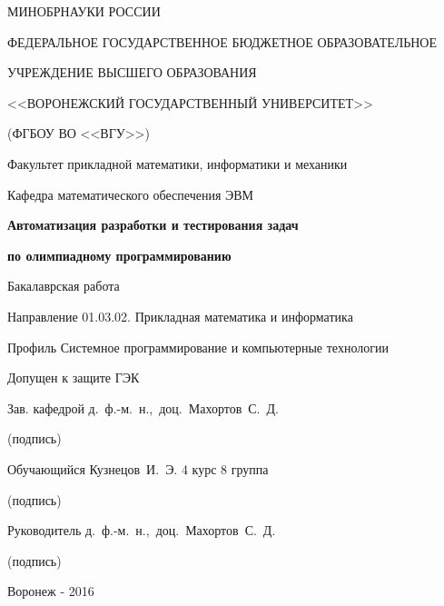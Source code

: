 \thispagestyle{empty}

\begin{center}
{\small
МИНОБРНАУКИ РОССИИ\par
ФЕДЕРАЛЬНОЕ ГОСУДАРСТВЕННОЕ БЮДЖЕТНОЕ ОБРАЗОВАТЕЛЬНОЕ\par
УЧРЕЖДЕНИЕ ВЫСШЕГО ОБРАЗОВАНИЯ\par
<<ВОРОНЕЖСКИЙ ГОСУДАРСТВЕННЫЙ УНИВЕРСИТЕТ>>\par
(ФГБОУ ВО <<ВГУ>>)\par
\vspace{4mm}}

Факультет прикладной математики, информатики и механики\par
\vspace{5mm}
Кафедра математического обеспечения ЭВМ\par
\vspace{35mm}

\textbf{Автоматизация разработки и тестирования задач}\par
\textbf{по олимпиадному программированию}\par
\vspace{8mm}

Бакалаврская работа\par
Направление 01.03.02. Прикладная математика и информатика\par
Профиль Системное программирование и компьютерные технологии\par
\end{center}
\vspace{35mm}

Допущен к защите ГЭК \underline{\qquad\qquad\qquad}\par
\vspace{8mm}
Зав. кафедрой \underline{\qquad\qquad\qquad} \qquad\qquad\qquad д.~ф.-м.~н.,~доц.~Махортов~С.~Д.\par
\qquad\qquad\qquad\qquad(подпись)\par
\vspace{2mm}
Обучающийся \underline{\qquad\qquad\qquad} \qquad\qquad\qquad Кузнецов~И.~Э. 4 курс 8 группа\par
\qquad\qquad\qquad\qquad(подпись)\par
\vspace{2mm}
Руководитель \underline{\qquad\qquad\qquad} \qquad\qquad\qquad д.~ф.-м.~н.,~доц.~Махортов~С.~Д.\par
\qquad\qquad\qquad\qquad(подпись)\par
\vspace{11mm}

\begin{center}
Воронеж - 2016
\end{center}